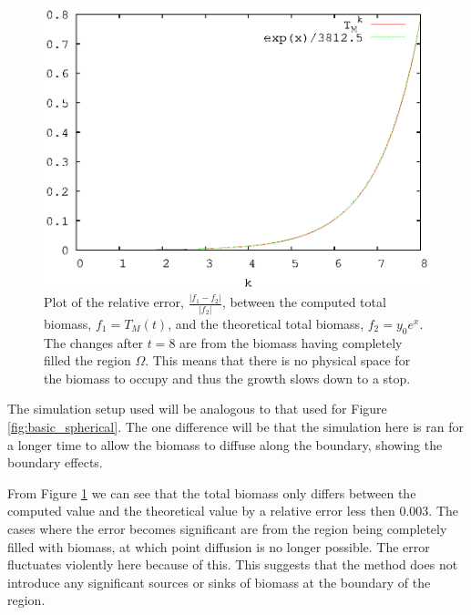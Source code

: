  \begin{figure}[!htp]
    \centering
    \includegraphics[scale = 0.9]{basic_growth}
    \caption{Plot of the relative error, $\frac{|f_1 - f_2|}{|f_2|}$, between the computed total biomass, $f_1 = T_{M}(t)$, and the theoretical total biomass, $f_2 = y_0 e^x$. 
      The changes after $t = 8$ are from the biomass having completely filled the region $\Omega$.
      This means that there is no physical space for the biomass to occupy and thus the growth slows down to a stop.}
    \label{fig:basic_growth}
  \end{figure}

  The simulation setup used will be analogous to that used for Figure \ref{fig:basic_spherical}.
  The one difference will be that the simulation here is ran for a longer time to allow the biomass to diffuse along the boundary, showing the boundary effects.

  From Figure \ref{fig:basic_growth} we can see that the total biomass only differs between the computed value and the theoretical value by a relative error less then $0.003$.
  The cases where the error becomes significant are from the region being completely filled with biomass, at which point diffusion is no longer possible.
  The error fluctuates violently here because of this.
  This suggests that the method does not introduce any significant sources or sinks of biomass at the boundary of the region.

